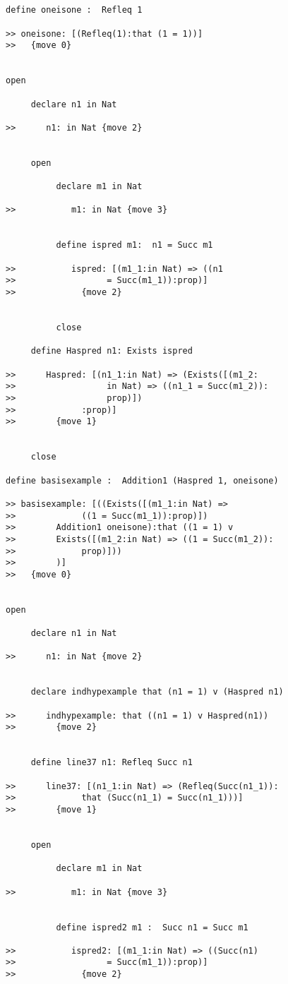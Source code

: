\documentclass[12pt]{article}
\begin{document}
\begin{verbatim}


define oneisone :  Refleq 1

>> oneisone: [(Refleq(1):that (1 = 1))]
>>   {move 0}


open 

     declare n1 in Nat

>>      n1: in Nat {move 2}


     open

          declare m1 in Nat

>>           m1: in Nat {move 3}


          define ispred m1:  n1 = Succ m1

>>           ispred: [(m1_1:in Nat) => ((n1 
>>                  = Succ(m1_1)):prop)]
>>             {move 2}


          close

     define Haspred n1: Exists ispred

>>      Haspred: [(n1_1:in Nat) => (Exists([(m1_2:
>>                  in Nat) => ((n1_1 = Succ(m1_2)):
>>                  prop)])
>>             :prop)]
>>        {move 1}


     close

define basisexample :  Addition1 (Haspred 1, oneisone)

>> basisexample: [((Exists([(m1_1:in Nat) => 
>>             ((1 = Succ(m1_1)):prop)])
>>        Addition1 oneisone):that ((1 = 1) v 
>>        Exists([(m1_2:in Nat) => ((1 = Succ(m1_2)):
>>             prop)]))
>>        )]
>>   {move 0}


open

     declare n1 in Nat

>>      n1: in Nat {move 2}


     declare indhypexample that (n1 = 1) v (Haspred n1)

>>      indhypexample: that ((n1 = 1) v Haspred(n1)) 
>>        {move 2}


     define line37 n1: Refleq Succ n1

>>      line37: [(n1_1:in Nat) => (Refleq(Succ(n1_1)):
>>             that (Succ(n1_1) = Succ(n1_1)))]
>>        {move 1}


     open

          declare m1 in Nat

>>           m1: in Nat {move 3}


          define ispred2 m1 :  Succ n1 = Succ m1

>>           ispred2: [(m1_1:in Nat) => ((Succ(n1) 
>>                  = Succ(m1_1)):prop)]
>>             {move 2}



\end{verbatim}
\end{document}
